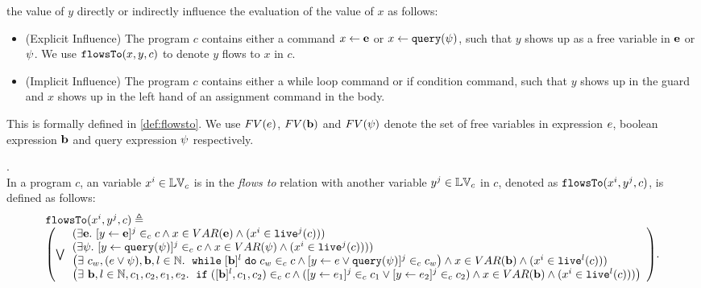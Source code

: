 {the value of ${y}$ directly or indirectly influence the evaluation of the value of ${x}$ as follows:
%
\begin{itemize}
\item (Explicit Influence) The program ${c}$ contains either 
a command $\mathrel{ {x} \leftarrow {\boldsymbol{\mathbf{e}}} }$ or $\mathrel{ {x} \leftarrow {\tt query}({\psi}) }$,
such that ${y}$ shows up as a free variable in ${\boldsymbol{\mathbf{e}}}$ or ${\psi}$.
We use $\mathtt{flowsTo}({x, y, c})$ to denote ${y}$ flows to ${x}$ in ${c}$.
%
\item (Implicit Influence) The program ${c}$ contains either a while loop
command
or if condition command, such that ${y}$ shows up in the guard
and ${x}$ shows up in the left hand of an assignment command in the body.
\end{itemize}
%
This is formally defined in \ref{def:flowsto}.
We use $FV(e)$, $FV({\boldsymbol{\mathbf{b}}})$ and $FV(\psi)$ denote the set of free variables in 
expression $e$, boolean expression ${\boldsymbol{\mathbf{b}}}$ and query expression $\psi$ respectively.
%
\\
%
\begin{defn}.
\label{def:flowsto}
\\
In a program  ${c}$,
an variable ${x^i}  \in \mathbb{LV}_c $ is in the \emph{flows to} relation with another variable ${y^j} \in \mathbb{LV}_c$
in ${c}$, denoted as $\mathtt{flowsTo}({x^i, y^j, c})$, is defined as follows:
%
\[
\begin{array}{l}
\flowsto({x^i, y^j, c}) \triangleq 
\\
\left( \bigvee
\begin{array}{l}
(\exists \sexpr . ~ [\assign{y}{\sexpr}]^j \in_{c} {c} 
\land {x} \in VAR(\sexpr) \land (x^i \in \live^j(c)))
\\
(\exists {\qexpr}. ~ [\assign{y}{\query({\qexpr})}]^j \in_{c} {c} 
\land x \in VAR({\qexpr}) \land (x^i \in \live^j(c))))
\\
\big(\exists  ~ {c_w}, {(\expr \lor \qexpr)}, \sbexpr, l \in \mathbb{N}. ~
	\ewhile [\sbexpr]^l \edo {c_w} \in_{c} {c}
	\land 
	[{\assign{y}{\expr \lor \query(\qexpr)}}]^{j} \in_{c}  {c_w}
\big) \land {x} \in VAR(\sbexpr) \land (x^i \in \live^l(c)))
\\
\big(
\exists ~ \sbexpr, l \in \mathbb{N}, {c_1}, {c_2}, {\expr}_1, {\expr}_2. ~
	\eif([\sbexpr]^l, {c_1}, {c_2}) \in_{c} {c} \land
	([{\assign{y}{\expr_1}}]^j \in_{c} {c_1} \lor 
	[{\assign{y}{\expr_2}}]^j \in_{c} {c_2})
\land {x} \in VAR(\sbexpr) \land (x^i \in \live^l(c)))
\big)
\end{array}
\right).
\end{array}
\]
%
\end{defn}
}
